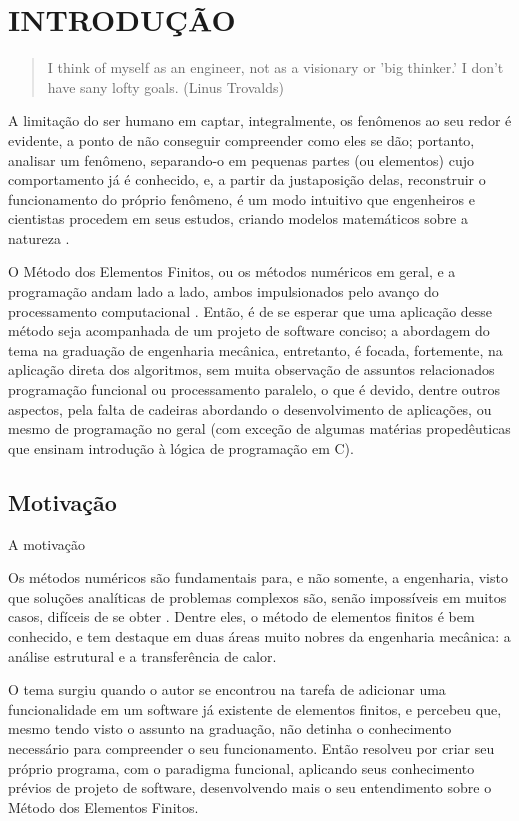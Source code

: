 

\chapter{INTRODUÇÃO}

\begin{quote}
    I think of myself as an engineer, not as a visionary or 'big thinker.' I don't have sany lofty goals.
    (Linus Trovalds)  
\end{quote}

A limitação do ser humano em captar, integralmente, os fenômenos ao seu redor é evidente, a ponto de não conseguir compreender como eles se dão; portanto, analisar um fenômeno, separando-o em pequenas partes (ou elementos) cujo comportamento já é conhecido, e, a partir da justaposição delas, reconstruir o funcionamento do próprio fenômeno, é um modo intuitivo que engenheiros e cientistas procedem em seus estudos, criando modelos matemáticos sobre a natureza \cite{Zin}.

O Método dos Elementos Finitos, ou os métodos numéricos em geral, e a programação andam lado a lado, ambos impulsionados pelo avanço do processamento computacional \cite{Onate}. Então, é de se esperar que uma aplicação desse método seja acompanhada de um projeto de software conciso; a abordagem do tema na graduação de engenharia mecânica, entretanto, é focada, fortemente, na aplicação direta dos algoritmos, sem muita observação de assuntos relacionados programação funcional ou processamento paralelo, o que é devido, dentre outros aspectos, pela falta de cadeiras abordando o desenvolvimento de aplicações, ou mesmo de programação no geral (com exceção de algumas matérias propedêuticas que ensinam introdução à lógica de programação em C).


\section{Motivação}

A motivação

Os métodos numéricos são fundamentais para, e não somente, a engenharia, visto que soluções analíticas de problemas complexos são, senão impossíveis em muitos casos, difíceis de se obter \cite{Onate}. Dentre eles, o método de elementos finitos é bem conhecido, e tem destaque em duas áreas muito nobres da engenharia mecânica: a análise estrutural e a transferência de calor.

O tema surgiu quando o autor se encontrou na tarefa de adicionar uma funcionalidade em um software já existente de elementos finitos, e percebeu que, mesmo tendo visto o assunto na graduação, não detinha o conhecimento necessário para compreender o seu funcionamento. Então resolveu por criar seu próprio programa, com o paradigma funcional, aplicando seus conhecimento prévios de projeto de software, desenvolvendo mais o seu entendimento sobre o Método dos Elementos Finitos.


